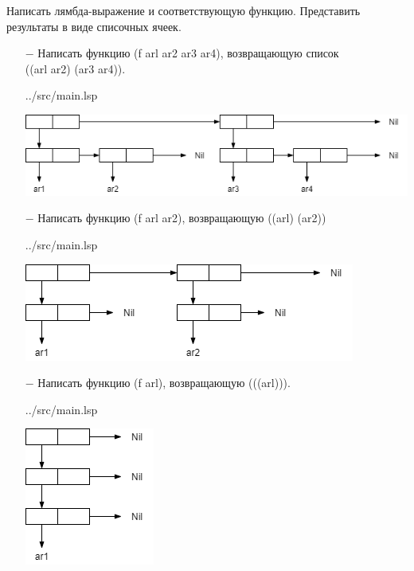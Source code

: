 Написать лямбда-выражение и соответствующую функцию. Представить результаты в виде списочных ячеек.

\begin{itemize}[topsep=0pt, noitemsep]
	\item[$-$] Написать функцию (f arl ar2 ar3 ar4), возвращающую список \\((arl ar2) (ar3 ar4)).
	\begin{lstinputlisting}[
		label={lst:t4},
		style={lsp},
		linerange={38-42},
		]{../src/main.lsp}
	\end{lstinputlisting}
	\includegraphics[scale=0.7]{img/1}

	\item[$-$] Написать функцию (f arl ar2), возвращающую ((arl) (ar2))
	\begin{lstinputlisting}[
		label={lst:t4},
		style={lsp},
		linerange={44-48},
		]{../src/main.lsp}
	\end{lstinputlisting}
	\includegraphics[scale=0.7]{img/2}

	\item[$-$] Написать функцию (f arl), возвращающую (((arl))).
	\begin{lstinputlisting}[
		label={lst:t4},
		style={lsp},
		linerange={50-54},
		]{../src/main.lsp}
	\end{lstinputlisting}
	\includegraphics[scale=0.7]{img/3}

\end{itemize}

